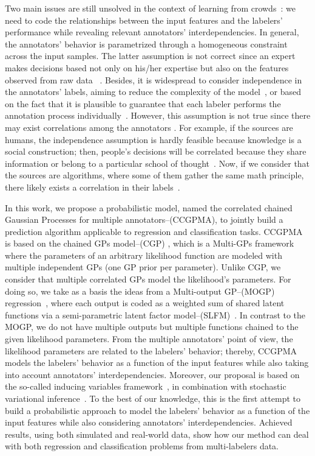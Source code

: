 \documentclass[journal]{IEEEtran}
\begin{document}
Two main issues are still unsolved in the context of learning from crowds~\cite{g2019machine}: we need to code the relationships between the input
features and the labelers' performance while revealing relevant annotators' interdependencies. In general,  the annotators' behavior is parametrized through a homogeneous constraint across the input samples. The latter assumption is not correct since an expert makes decisions based not only on his/her expertise but also on the features observed from raw data ~\cite{raykar2010learning}. Besides, it is
widespread to consider independence in the annotators' labels, aiming
to reduce the complexity of the model~\cite{venanzi2014community}, or
based on the fact that it is plausible to guarantee that each labeler
performs the annotation process
individually~\cite{tang2019leveraging}. However, this assumption is
not true since there may exist correlations among the
annotators \cite{zhang2011learning}. For example, if the sources are
humans, the independence assumption is hardly feasible because
knowledge is a social construction; then, people's decisions will be
correlated because they share information or belong to a particular school of
thought~\cite{surowiecki2005wisdom,hahn2018communication}. Now, if we consider that the sources are algorithms, where some of them gather the same math principle, there likely exists a
correlation in their labels~\cite{zhu2019unsupervised}. 

In this work, we propose a probabilistic model, named the correlated chained Gaussian Processes for multiple annotators--(CCGPMA), to jointly build a prediction algorithm applicable to regression and classification tasks. CCGPMA is based on the chained GPs model--(CGP) \cite{saul2016chained}, which is a Multi-GPs framework where the
parameters of an arbitrary likelihood function are modeled with
multiple independent GPs (one GP prior per parameter). Unlike CGP, we consider that multiple correlated GPs model the likelihood's parameters. For doing so, we take as a basis the ideas from a Multi-output GP--(MOGP) regression~\cite{alvarez2012kernels}, where each output is coded as a weighted sum of shared latent functions via a semi-parametric latent factor model--(SLFM)~\cite{teh2005semiparametric}. In contrast to the MOGP, we do not have multiple outputs but multiple functions chained to the given likelihood parameters. From the multiple annotators' point of view, the likelihood parameters are related to the labelers' behavior; thereby, CCGPMA models the labelers' behavior as a function of the input features while also taking into account annotators' interdependencies. Moreover, our proposal is based on the so-called inducing variables framework~\cite{alvarez2010efficient}, in combination with stochastic variational inference~\cite{hoffman2013stochastic}. To the best of our knowledge, this is the first attempt to build a probabilistic approach to model the labelers' behavior as a function of the input features while also considering annotators' interdependencies. Achieved results, using both simulated and real-world data, show how our method can deal with both regression and classification problems from multi-labelers data.
\end{document}
